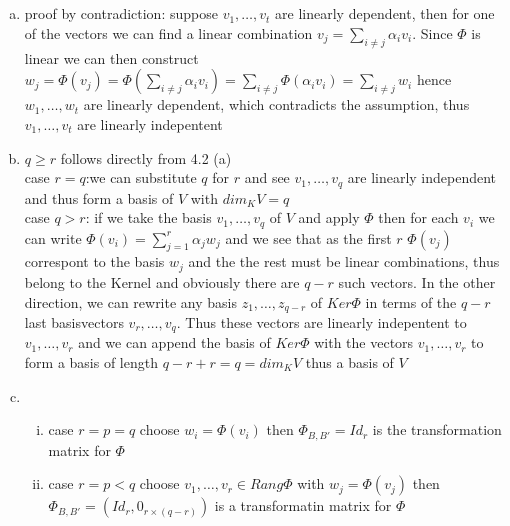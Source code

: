 \documentclass[a4paper,10pt]{article}
\begin{document}
\subsection{}
\label{sec:five}

\begin{enumerate}[(a)]
	\item proof by contradiction: suppose $v_1,\dots,v_t$ are linearly dependent, then for one of the vectors we can find a linear combination $ v_j=\sum_{i\neq j} \alpha_i v_i$. Since $\Phi$ is linear we can then construct $ w_j=\Phi(v_j)=\Phi(\sum_{i\neq j}\alpha _iv_i)=\sum_{i\neq j}\Phi(\alpha _i v_i)=\sum_{i\neq j} w_i$ hence $w_1,\dots,w_t$ are linearly dependent, which contradicts the assumption, thus $v_1,\dots,v_t$ are linearly indepentent
	\item $ q \geq r$ follows directly from 4.2 (a)\\
		case $r=q$:we can substitute $q$ for $r$ and see $v_1,\dots,v_q$ are linearly independent and thus form a basis of $V$ with $dim_K V=q$\\
		case $q>r$: if we take the basis $v_1,\dots,v_q$ of $V$ and apply $\Phi$ then for each $v_i$ we can write $\Phi(v_i)=\sum_{j=1}^{r} \alpha _j w_j$ and we see that as the first $r$ $\Phi(v_j)$ correspont to the basis $w_j$ and the the rest must be linear combinations, thus belong to the Kernel and obviously there are $q-r$ such vectors. In the other direction, we can rewrite any basis $z_1,\dots,z_{q-r}$ of $Ker\Phi$ in terms of the $q-r$ last basisvectors $v_r,\dots,v_q$. Thus these vectors are linearly indepentent to $v_1,\dots,v_r$ and we can append the basis of $Ker\Phi$ with the vectors $v_1,\dots,v_r$ to form a basis of length $ q-r+r=q= dim_K V$ thus a basis of $V$
	\item \begin{enumerate}[(i)]
		\item case $r=p=q$ choose $w_i=\Phi(v_i)$ then  $\Phi_{B,B'}=Id_r$ is the transformation matrix for $\Phi$
		\item case $r=p<q$ choose $v_1,\dots,v_r \in Rang \Phi$ with $w_j=\Phi(v_j)$ then $\Phi_{B,B'}= \left( Id_r, 0_{r\times(q-r)} \right)$ is a transformatin matrix for $\Phi$
	\end{enumerate}
\end{enumerate}
\end{document}
